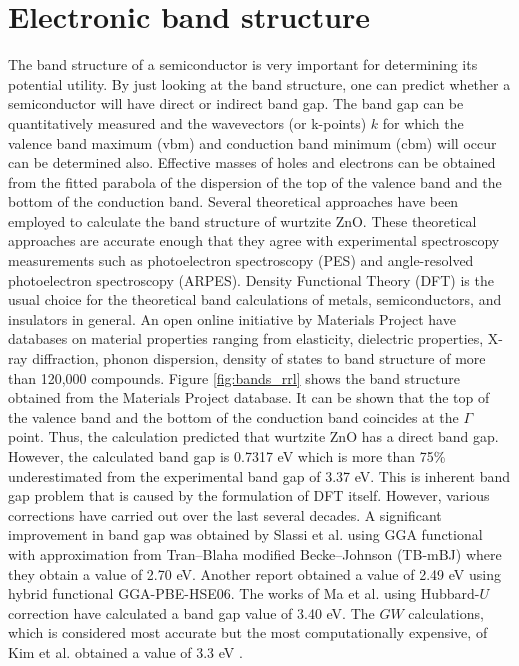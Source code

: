 
\section{Electronic band structure}
The band structure  of a semiconductor is very important for determining its potential utility. By just looking at the band structure, one can predict whether a semiconductor will have  direct or indirect band gap. The band gap can be quantitatively measured  and the wavevectors (or k-points) $k$ for which the valence band maximum (vbm) and conduction band minimum (cbm) will occur can be determined also. Effective masses of holes and electrons can be obtained from the fitted parabola of the dispersion of the top of the valence band and the bottom of the conduction band.  Several theoretical approaches have been employed to calculate the band structure of wurtzite ZnO. These theoretical approaches are accurate enough that they agree with experimental spectroscopy  measurements such as photoelectron spectroscopy (PES) and angle-resolved photoelectron spectroscopy (ARPES). Density Functional Theory (DFT) is the usual choice for the theoretical band calculations of metals, semiconductors, and insulators in general. An open online initiative by Materials Project \citep{Jain2013,Ong2015} have databases on material properties ranging from elasticity, dielectric properties, X-ray diffraction, phonon dispersion, density of states to band structure of more than 120,000 compounds. Figure \ref{fig:bands_rrl} shows the band structure obtained from the Materials Project database. It can be shown that the top of the valence band and the bottom of the conduction band coincides at the $\Gamma$ point. Thus, the calculation predicted that wurtzite ZnO has a direct band gap. However, the calculated band gap is 0.7317 eV which is more than 75\% underestimated from the experimental band gap of 3.37 eV. This is inherent band gap problem  that is caused by the formulation of DFT itself. However, various corrections have carried out over the last several decades. A significant improvement in band gap was obtained by Slassi et al. \citep{Slassi2014} using GGA functional with approximation from Tran–Blaha modified Becke–Johnson (TB-mBJ) where they obtain a value of 2.70 eV. Another report \citep{Luo2014} obtained a value of  2.49 eV using hybrid functional GGA-PBE-HSE06. The works of Ma et al. \citep{Ma2013} using Hubbard-$U$ correction have calculated a band gap value of 3.40 eV. The $GW$ calculations, which is considered most accurate but the most computationally expensive, of Kim et al. obtained a value of 3.3 eV \citep{Kim2012}.


